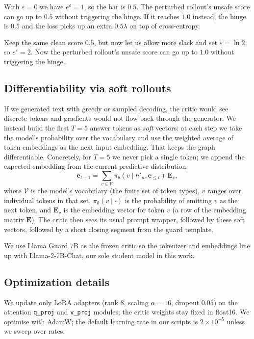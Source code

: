 \documentclass{article}
\begin{document}
With $\varepsilon{=}0$ we have $e^{\varepsilon}{=}1$, so the bar is $0.5$. The perturbed rollout's unsafe score can go up to $0.5$ without triggering the hinge. If it reaches $1.0$ instead, the hinge is $0.5$ and the loss picks up an extra $0.5\lambda$ on top of cross-entropy.

Keep the same clean score $0.5$, but now let us allow more slack and set $\varepsilon{=}\ln 2$, so $e^{\varepsilon}{=}2$. Now the perturbed rollout’s unsafe score can go up to $1.0$ without triggering the hinge.

\subsection{Differentiability via soft rollouts}
If we generated text with greedy or sampled decoding, the critic would see discrete tokens and gradients would not flow back through the generator. We instead build the first $T{=}5$ answer tokens as \emph{soft} vectors: at each step we take the model's probability over the vocabulary and use the weighted average of token embeddings as the next input embedding. That keeps the graph differentiable. Concretely, for $T{=}5$ we never pick a single token; we append the expected embedding from the current predictive distribution,
\[
\mathbf{e}_{t+1}=\sum_{v\in\mathcal{V}} \pi_\theta(v\mid h'_n,\mathbf{e}_{\le t})\,\mathbf{E}_v,
\]
where $\mathcal{V}$ is the model's vocabulary (the finite set of token types), $v$ ranges over individual tokens in that set, $\pi_\theta(v\mid\cdot)$ is the probability of emitting $v$ as the next token, and $\mathbf{E}_v$ is the embedding vector for token $v$ (a row of the embedding matrix $\mathbf{E}$). The critic then sees its usual prompt wrapper, followed by these soft vectors, followed by a short closing segment from the guard template.

We use Llama Guard 7B as the frozen critic \citep{inan2023llamaguard} so the tokenizer and embeddings line up with Llama-2-7B-Chat, our sole student model in this work.

\subsection{Optimization details}
We update only LoRA adapters (rank $8$, scaling $\alpha{=}16$, dropout $0.05$) on the attention \texttt{q\_proj} and \texttt{v\_proj} modules; the critic weights stay fixed in float16. We optimise with AdamW; the default learning rate in our scripts is $2{\times}10^{-5}$ unless we sweep over rates.
\end{document}
